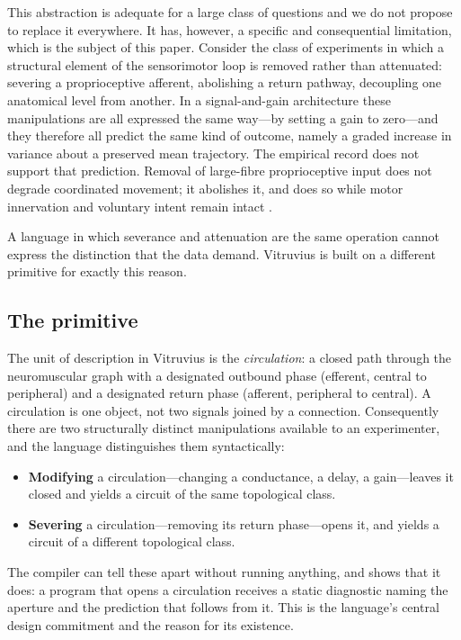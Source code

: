 \documentclass[11pt,twocolumn,a4paper]{article}
\theoremstyle{thmstyle}
\theoremstyle{definition}
\theoremstyle{remark}
\begin{document}
This abstraction is adequate for a large class of questions and we do not
propose to replace it everywhere. It has, however, a specific and consequential
limitation, which is the subject of this paper. Consider the class of
experiments in which a structural element of the sensorimotor loop is removed
rather than attenuated: severing a proprioceptive afferent, abolishing a
return pathway, decoupling one anatomical level from another. In a
signal-and-gain architecture these manipulations are all expressed the same
way---by setting a gain to zero---and they therefore all predict the same kind
of outcome, namely a graded increase in variance about a preserved mean
trajectory. The empirical record does not support that prediction. Removal of
large-fibre proprioceptive input does not degrade coordinated movement; it
abolishes it, and does so while motor innervation and voluntary intent remain
intact \citep{cole1991,sainburg1995,ghez1995,lajoie1996,taub1965}.

A language in which severance and attenuation are the same operation cannot
express the distinction that the data demand. Vitruvius is built on a different
primitive for exactly this reason.

\subsection{The primitive}

The unit of description in Vitruvius is the \emph{circulation}: a closed path
through the neuromuscular graph with a designated outbound phase (efferent,
central to peripheral) and a designated return phase (afferent, peripheral to
central). A circulation is one object, not two signals joined by a connection.
Consequently there are two structurally distinct manipulations available to an
experimenter, and the language distinguishes them syntactically:

\begin{itemize}[leftmargin=1.4em,itemsep=2pt]
\item \textbf{Modifying} a circulation---changing a conductance, a delay, a
gain---leaves it closed and yields a circuit of the same topological class.
\item \textbf{Severing} a circulation---removing its return phase---opens it,
and yields a circuit of a different topological class.
\end{itemize}

The compiler can tell these apart without running anything, and
 shows that it does: a program that opens a circulation
receives a static diagnostic naming the aperture and the prediction that
follows from it. This is the language's central design commitment and the
reason for its existence.
\end{document}
